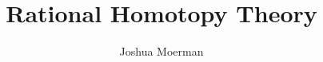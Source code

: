 \documentclass[a4paper, 12pt, draft]{amsart}
\title{Rational Homotopy Theory}
\author{Joshua Moerman}
\begin{document}
\maketitle
\tableofcontents

 \newpage
 \newpage

\nocite{*}


\end{document}
